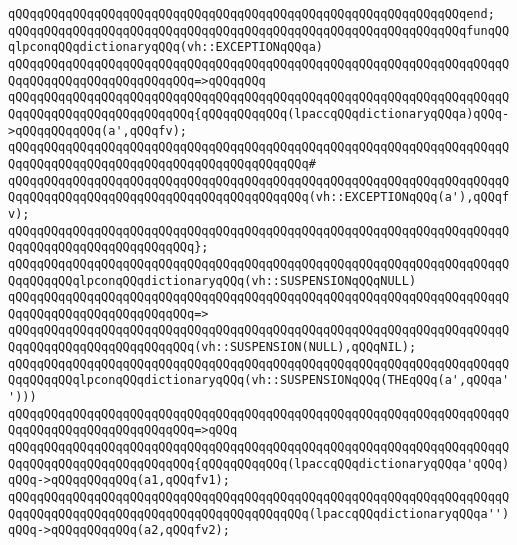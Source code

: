 \verb|qQQqqQQqqQQqqQQqqQQqqQQqqQQqqQQqqQQqqQQqqQQqqQQqqQQqqQQqqQQqqQQqend;|\newline
\newline
\verb|qQQqqQQqqQQqqQQqqQQqqQQqqQQqqQQqqQQqqQQqqQQqqQQqqQQqqQQqqQQqqQQqfunqQQqlpconqQQqdictionaryqQQq(vh::EXCEPTIONqQQqa)|\newline
\verb|qQQqqQQqqQQqqQQqqQQqqQQqqQQqqQQqqQQqqQQqqQQqqQQqqQQqqQQqqQQqqQQqqQQqqQQqqQQqqQQqqQQqqQQqqQQqqQQq=>qQQqqQQq|\newline
\verb|qQQqqQQqqQQqqQQqqQQqqQQqqQQqqQQqqQQqqQQqqQQqqQQqqQQqqQQqqQQqqQQqqQQqqQQqqQQqqQQqqQQqqQQqqQQqqQQq{qQQqqQQqqQQq(lpaccqQQqdictionaryqQQqa)qQQq->qQQqqQQqqQQq(a',qQQqfv);|\newline
\verb|qQQqqQQqqQQqqQQqqQQqqQQqqQQqqQQqqQQqqQQqqQQqqQQqqQQqqQQqqQQqqQQqqQQqqQQqqQQqqQQqqQQqqQQqqQQqqQQqqQQqqQQqqQQqqQQq#|\newline
\verb|qQQqqQQqqQQqqQQqqQQqqQQqqQQqqQQqqQQqqQQqqQQqqQQqqQQqqQQqqQQqqQQqqQQqqQQqqQQqqQQqqQQqqQQqqQQqqQQqqQQqqQQqqQQqqQQq(vh::EXCEPTIONqQQq(a'),qQQqfv);|\newline
\verb|qQQqqQQqqQQqqQQqqQQqqQQqqQQqqQQqqQQqqQQqqQQqqQQqqQQqqQQqqQQqqQQqqQQqqQQqqQQqqQQqqQQqqQQqqQQqqQQq};|\newline
\newline
\verb|qQQqqQQqqQQqqQQqqQQqqQQqqQQqqQQqqQQqqQQqqQQqqQQqqQQqqQQqqQQqqQQqqQQqqQQqqQQqqQQqlpconqQQqdictionaryqQQq(vh::SUSPENSIONqQQqNULL)|\newline
\verb|qQQqqQQqqQQqqQQqqQQqqQQqqQQqqQQqqQQqqQQqqQQqqQQqqQQqqQQqqQQqqQQqqQQqqQQqqQQqqQQqqQQqqQQqqQQqqQQq=>|\newline
\verb|qQQqqQQqqQQqqQQqqQQqqQQqqQQqqQQqqQQqqQQqqQQqqQQqqQQqqQQqqQQqqQQqqQQqqQQqqQQqqQQqqQQqqQQqqQQqqQQq(vh::SUSPENSION(NULL),qQQqNIL);|\newline
\newline
\verb|qQQqqQQqqQQqqQQqqQQqqQQqqQQqqQQqqQQqqQQqqQQqqQQqqQQqqQQqqQQqqQQqqQQqqQQqqQQqqQQqlpconqQQqdictionaryqQQq(vh::SUSPENSIONqQQq(THEqQQq(a',qQQqa'')))|\newline
\verb|qQQqqQQqqQQqqQQqqQQqqQQqqQQqqQQqqQQqqQQqqQQqqQQqqQQqqQQqqQQqqQQqqQQqqQQqqQQqqQQqqQQqqQQqqQQqqQQq=>qQQq|\newline
\verb|qQQqqQQqqQQqqQQqqQQqqQQqqQQqqQQqqQQqqQQqqQQqqQQqqQQqqQQqqQQqqQQqqQQqqQQqqQQqqQQqqQQqqQQqqQQqqQQq{qQQqqQQqqQQq(lpaccqQQqdictionaryqQQqa'qQQq)qQQq->qQQqqQQqqQQq(a1,qQQqfv1);|\newline
\verb|qQQqqQQqqQQqqQQqqQQqqQQqqQQqqQQqqQQqqQQqqQQqqQQqqQQqqQQqqQQqqQQqqQQqqQQqqQQqqQQqqQQqqQQqqQQqqQQqqQQqqQQqqQQqqQQq(lpaccqQQqdictionaryqQQqa'')qQQq->qQQqqQQqqQQq(a2,qQQqfv2);|\newline
